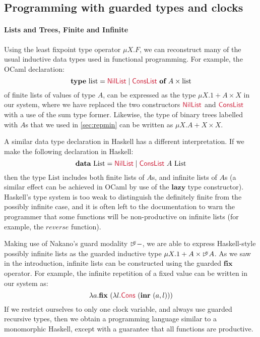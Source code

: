 \documentclass[natbib]{sigplanconf}
\newcommand{\cons}[1]{\textcolor{cons}{\textsf{#1}}}
\newcommand{\kw}[1]{\textbf{#1}}
\newcommand{\tyname}[1]{\textrm{#1}}
\newcommand{\ident}[1]{\textit{#1}}
\newcommand{\delay}[1]{\mathord{\rhd\kern-0.4em^{#1}}}
\begin{document}
\subsection{Programming with guarded types and clocks}
\label{sec:examples}

\paragraph{Lists and Trees, Finite and Infinite} Using the least
fixpoint type operator $\mu X. F$, we can reconstruct many of the
usual inductive data types used in functional programming. For
example, the OCaml declaration:
\begin{displaymath}
  \kw{type}~\tyname{list} = \cons{NilList} \mathrel| \cons{ConsList}~\kw{of}~A\times\tyname{list}
\end{displaymath}
of finite lists of values of type $A$, can be expressed as the type
$\mu X. 1 + A \times X$ in our system, where we have replaced the two
constructors $\cons{NilList}$ and $\cons{ConsList}$ with a use of the
sum type former. Likewise, the type of binary trees labelled with $A$s
that we used in \autoref{sec:repmin} can be written as $\mu X. A + X
\times X$.

A similar data type declaration in Haskell has a different
interpretation. If we make the following declaration in Haskell:
\begin{displaymath}
  \kw{data}~\tyname{List} = \cons{NilList} \mathrel| \cons{ConsList}~A~\tyname{List}
\end{displaymath}
then the type $\tyname{List}$ includes both finite lists of $A$s, and
infinite lists of $A$s (a similar effect can be achieved in OCaml by
use of the $\kw{lazy}$ type constructor). Haskell's type system is too
weak to distinguish the definitely finite from the possibly infinite
case, and it is often left to the documentation to warn the programmer
that some functions will be non-productive on infinite lists (for
example, the $\ident{reverse}$ function).

Making use of Nakano's guard modality $\delay\kappa-$, we are able to
express Haskell-style possibly infinite lists as the guarded inductive
type $\mu X. 1 + A \times \delay\kappa A$. As we saw in the
introduction, infinite lists can be constructed using the guarded
$\kw{fix}$ operator. For example, the infinite repetition of a fixed
value can be written in our system as:
\begin{displaymath}
  \lambda a. \kw{fix}~(\lambda l. \cons{Cons}~(\kw{inr}~(a,l)))
\end{displaymath}
If we restrict ourselves to only one clock variable, and always use
guarded recursive types, then we obtain a programming language similar
to a monomorphic Haskell, except with a guarantee that all functions
are productive.
\end{document}
